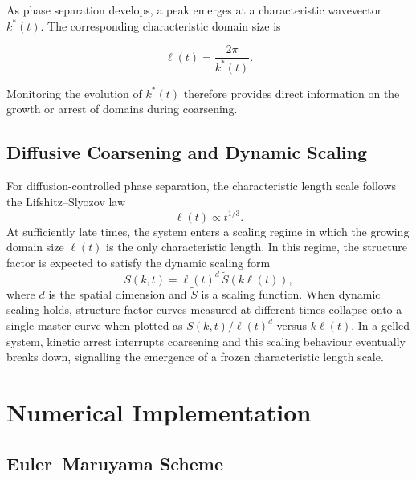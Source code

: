 \documentclass[11pt,a4paper]{article}
\begin{document}
As phase separation develops, a peak emerges at a characteristic wavevector $k^{*}(t)$. The corresponding characteristic domain size is

\begin{equation}
\ell(t)
=
\frac{2\pi}{k^{*}(t)}.
\label{eq:length_scale}
\end{equation}

Monitoring the evolution of $k^{*}(t)$ therefore provides direct information on the growth or arrest of domains during coarsening.

\subsection{Diffusive Coarsening and Dynamic Scaling}

For diffusion-controlled phase separation, the characteristic length scale follows the Lifshitz--Slyozov law
\begin{equation}
    \ell(t) \propto t^{1/3}.
\end{equation}
At sufficiently late times, the system enters a scaling regime in which the growing domain size $\ell(t)$ is the only characteristic length. In this regime, the structure factor is expected to satisfy the dynamic scaling form\begin{equation}
    S(k,t)
    =
    \ell(t)^d\,\widetilde S\!\left(k\ell(t)\right),
    \label{eq:dynamic_scaling}
\end{equation}
where $d$ is the spatial dimension and $\widetilde S$ is a scaling function. When dynamic scaling holds, structure-factor curves measured at different times collapse onto a single master curve when plotted as $S(k,t)/\ell(t)^d$ versus $k\ell(t)$. In a gelled system, kinetic arrest interrupts coarsening and this scaling behaviour eventually breaks down, signalling the emergence of a frozen characteristic length scale.

\section{Numerical Implementation}

\subsection{Euler--Maruyama Scheme}
\end{document}
